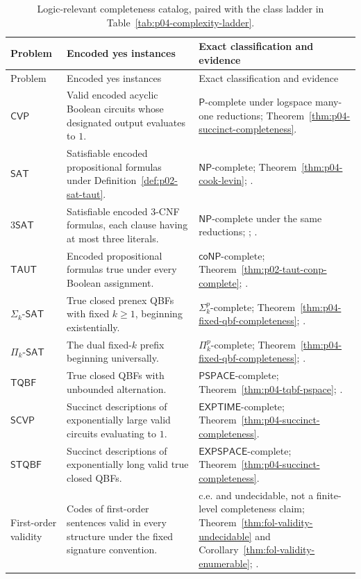 \begingroup\small
\begin{longtable}{@{}p{}p{}p{}@{}}
\caption{Logic-relevant completeness catalog, paired with the class ladder in
Table~\ref{tab:p04-complexity-ladder}.}
\label{tab:p04-completeness-catalog}\\
\toprule
Problem & Encoded yes instances & Exact classification and evidence \\
\midrule
\endfirsthead
\toprule
Problem & Encoded yes instances & Exact classification and evidence \\
\midrule
\endhead
\bottomrule
\endfoot
\(\mathsf{CVP}\) & Valid encoded acyclic Boolean circuits whose designated
output evaluates to \(1\). & \(\mathsf P\)-complete under logspace many-one
reductions; Theorem~\ref{thm:p04-succinct-completeness}. \\
\addlinespace
\(\mathsf{SAT}\) & Satisfiable encoded propositional formulas under
Definition~\ref{def:p02-sat-taut}. & \(\mathsf{NP}\)-complete;
Theorem~\ref{thm:p04-cook-levin}; \cite[thm.~2.10]{AroraBarak2009}. \\
\addlinespace
\(3\mathsf{SAT}\) & Satisfiable encoded 3-CNF formulas, each clause having at
most three literals. & \(\mathsf{NP}\)-complete under the same reductions;
\cite[thm.~2.10]{AroraBarak2009}; \cite{Karp1972}. \\
\addlinespace
\(\mathsf{TAUT}\) & Encoded propositional formulas true under every Boolean
assignment. & \(\mathsf{coNP}\)-complete;
Theorem~\ref{thm:p02-taut-conp-complete}; \cite{AroraBarak2009}. \\
\addlinespace
\(\Sigma_k\text{-}\mathsf{SAT}\) & True closed prenex QBFs with fixed
\(k\geq1\), beginning existentially. & \(\Sigma^p_k\)-complete;
Theorem~\ref{thm:p04-fixed-qbf-completeness}; \cite{Stockmeyer1976}. \\
\addlinespace
\(\Pi_k\text{-}\mathsf{SAT}\) & The dual fixed-\(k\) prefix beginning
universally. & \(\Pi^p_k\)-complete;
Theorem~\ref{thm:p04-fixed-qbf-completeness}; \cite{Stockmeyer1976}. \\
\addlinespace
\(\mathsf{TQBF}\) & True closed QBFs with unbounded alternation. &
\(\mathsf{PSPACE}\)-complete; Theorem~\ref{thm:p04-tqbf-pspace};
\cite{StockmeyerMeyer1973}. \\
\addlinespace
\(\mathsf{SCVP}\) & Succinct descriptions of exponentially large valid
circuits evaluating to \(1\). & \(\mathsf{EXPTIME}\)-complete;
Theorem~\ref{thm:p04-succinct-completeness}. \\
\addlinespace
\(\mathsf{STQBF}\) & Succinct descriptions of exponentially long valid true
closed QBFs. & \(\mathsf{EXPSPACE}\)-complete;
Theorem~\ref{thm:p04-succinct-completeness}. \\
\addlinespace
First-order validity & Codes of first-order sentences valid in every
structure under the fixed signature convention. & c.e. and undecidable, not
a finite-level completeness claim; Theorem~\ref{thm:fol-validity-undecidable}
and Corollary~\ref{thm:fol-validity-enumerable};
\cite{Church1936,Turing1937}. \\
\end{longtable}
\endgroup

